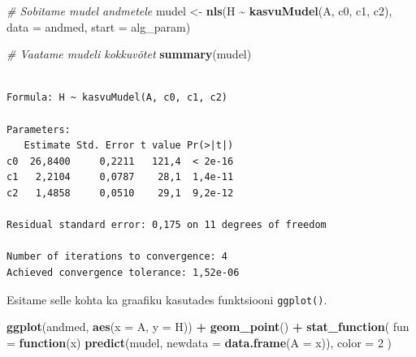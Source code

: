 \documentclass[
]{book}
\newenvironment{Shaded}{\begin{snugshade}}{\end{snugshade}}
\newcommand{\AttributeTok}[1]{\textcolor[rgb]{0.13,0.29,0.53}{#1}}
\newcommand{\CommentTok}[1]{\textcolor[rgb]{0.56,0.35,0.01}{\textit{#1}}}
\newcommand{\ControlFlowTok}[1]{\textcolor[rgb]{0.13,0.29,0.53}{\textbf{#1}}}
\newcommand{\DecValTok}[1]{\textcolor[rgb]{0.00,0.00,0.81}{#1}}
\newcommand{\FunctionTok}[1]{\textcolor[rgb]{0.13,0.29,0.53}{\textbf{#1}}}
\newcommand{\NormalTok}[1]{#1}
\newcommand{\OtherTok}[1]{\textcolor[rgb]{0.56,0.35,0.01}{#1}}
\newcommand{\SpecialCharTok}[1]{\textcolor[rgb]{0.81,0.36,0.00}{\textbf{#1}}}
\renewenvironment{Shaded} {\begin{snugshade}\footnotesize} {\end{snugshade}}
\begin{document}
\begin{Shaded}
\begin{Highlighting}[]
\CommentTok{\# Sobitame mudel andmetele}
\NormalTok{mudel }\OtherTok{\textless{}{-}} \FunctionTok{nls}\NormalTok{(H }\SpecialCharTok{\textasciitilde{}} \FunctionTok{kasvuMudel}\NormalTok{(A, c0, c1, c2), }\AttributeTok{data =}\NormalTok{ andmed, }\AttributeTok{start =}\NormalTok{ alg\_param)}
\end{Highlighting}
\end{Shaded}

\begin{Shaded}
\begin{Highlighting}[]
\CommentTok{\# Vaatame mudeli kokkuvõtet}
\FunctionTok{summary}\NormalTok{(mudel)}
\end{Highlighting}
\end{Shaded}

\begin{verbatim}

Formula: H ~ kasvuMudel(A, c0, c1, c2)

Parameters:
   Estimate Std. Error t value Pr(>|t|)
c0  26,8400     0,2211   121,4  < 2e-16
c1   2,2104     0,0787    28,1  1,4e-11
c2   1,4858     0,0510    29,1  9,2e-12

Residual standard error: 0,175 on 11 degrees of freedom

Number of iterations to convergence: 4 
Achieved convergence tolerance: 1,52e-06
\end{verbatim}

Esitame selle kohta ka graafiku kasutades funktsiooni \texttt{ggplot()}.

\begin{Shaded}
\begin{Highlighting}[]
\FunctionTok{ggplot}\NormalTok{(andmed, }\FunctionTok{aes}\NormalTok{(}\AttributeTok{x =}\NormalTok{ A, }\AttributeTok{y =}\NormalTok{ H)) }\SpecialCharTok{+}
  \FunctionTok{geom\_point}\NormalTok{() }\SpecialCharTok{+}
  \FunctionTok{stat\_function}\NormalTok{(}
    \AttributeTok{fun =} \ControlFlowTok{function}\NormalTok{(x)}
      \FunctionTok{predict}\NormalTok{(mudel, }\AttributeTok{newdata =} \FunctionTok{data.frame}\NormalTok{(}\AttributeTok{A =}\NormalTok{ x)),}
    \AttributeTok{color =} \DecValTok{2}
\NormalTok{  ) }
\end{Highlighting}
\end{Shaded}
\end{document}
